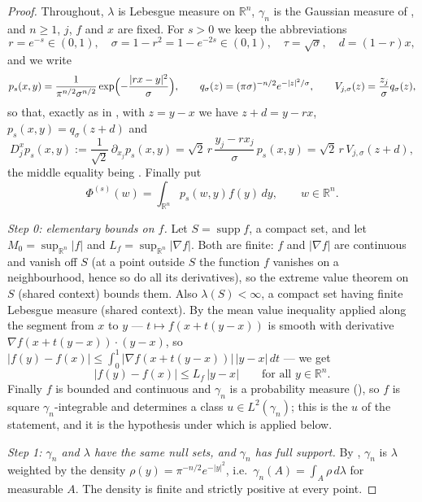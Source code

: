 \begin{proof}
Throughout, $\lambda$ is Lebesgue measure on $\mathbb{R}^n$, $\gamma_n$ is the
Gaussian measure of , and $n \geq 1$, $j$, $f$ and $x$ are
fixed.  For $s > 0$ we keep the abbreviations
\[
  r = e^{-s} \in (0,1),\quad \sigma = 1-r^2 = 1-e^{-2s} \in (0,1),
  \quad \tau = \sqrt\sigma, \quad d = (1-r)x ,
\]
and we write
\[
  p_s(x,y) = \frac{1}{\pi^{n/2}\sigma^{n/2}}
      \exp\Bigl(-\frac{|rx-y|^2}{\sigma}\Bigr),
  \qquad
  q_\sigma(z) = (\pi\sigma)^{-n/2}e^{-|z|^2/\sigma},
  \qquad
  V_{j,\sigma}(z) = \frac{z_j}{\sigma}q_\sigma(z) ,
\]
so that, exactly as in , with $z = y-x$ we
have $z+d = y-rx$, $p_s(x,y) = q_\sigma(z+d)$ and
\begin{equation*}
  D_j^xp_s(x,y) := \frac{1}{\sqrt2}\,\partial_{x_j}p_s(x,y)
    = \sqrt2\,r\,\frac{y_j-rx_j}{\sigma}\,p_s(x,y)
    = \sqrt2\,r\,V_{j,\sigma}(z+d) , \tag{0}
\end{equation*}
the middle equality being .  Finally put
\[
  \Phi^{(s)}(w) = \int_{\mathbb{R}^n}p_s(w,y)f(y)\,dy, \qquad w \in \mathbb{R}^n .
\]

\emph{Step 0: elementary bounds on $f$.}
Let $S = \operatorname{supp}f$, a compact set, and let
$M_0 = \sup_{\mathbb{R}^n}|f|$ and $L_f = \sup_{\mathbb{R}^n}|\nabla f|$.  Both
are finite: $f$ and $|\nabla f|$ are continuous and vanish off $S$ (at a point
outside $S$ the function $f$ vanishes on a neighbourhood, hence so do all its
derivatives), so the extreme value theorem on $S$ (shared context) bounds them.
Also $\lambda(S) < \infty$, a compact set having finite Lebesgue measure (shared
context).  By the mean value inequality applied along the segment from $x$ to
$y$ --- $t \mapsto f(x+t(y-x))$ is smooth with derivative
$\nabla f(x+t(y-x))\cdot(y-x)$, so
$|f(y)-f(x)| \leq \int_0^1|\nabla f(x+t(y-x))|\,|y-x|\,dt$ --- we get
\begin{equation*}
  |f(y)-f(x)| \leq L_f\,|y-x| \qquad \text{for all } y \in \mathbb{R}^n . \tag{1}
\end{equation*}
Finally $f$ is bounded and continuous and $\gamma_n$ is a probability measure
(), so $f$ is square $\gamma_n$-integrable and determines a
class $u \in L^2(\gamma_n)$; this is the $u$ of the statement, and it is the
hypothesis under which  is applied below.

\emph{Step 1: $\gamma_n$ and $\lambda$ have the same null sets, and $\gamma_n$
has full support.}
By , $\gamma_n$ is $\lambda$ weighted by the density
$\rho(y) = \pi^{-n/2}e^{-|y|^2}$, i.e.\ $\gamma_n(A) = \int_A\rho\,d\lambda$ for
measurable $A$.  The density is finite and strictly positive at every point.


\end{proof}
